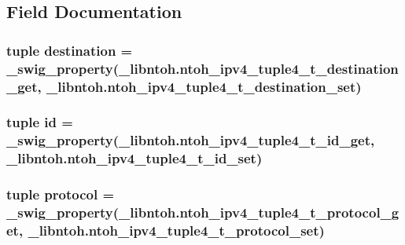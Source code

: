 \subsection{Field Documentation}
\hypertarget{classlibntoh_1_1ntoh__ipv4__tuple4__t_adaac82457baf1096d1c38cadf8123ce7}{
\subsubsection[{destination}]{\setlength{\rightskip}{0pt plus 5cm}tuple destination = {\bf \-\_\-swig\-\_\-property}(\-\_\-libntoh.\-ntoh\-\_\-ipv4\-\_\-tuple4\-\_\-t\-\_\-destination\-\_\-get, \-\_\-libntoh.\-ntoh\-\_\-ipv4\-\_\-tuple4\-\_\-t\-\_\-destination\-\_\-set)\hspace{0.3cm}{\ttfamily [static]}}}\label{classlibntoh_1_1ntoh__ipv4__tuple4__t_adaac82457baf1096d1c38cadf8123ce7}
\hypertarget{classlibntoh_1_1ntoh__ipv4__tuple4__t_a0e43f6071072440917ee2dd8af07d251}{
\subsubsection[{id}]{\setlength{\rightskip}{0pt plus 5cm}tuple id = {\bf \-\_\-swig\-\_\-property}(\-\_\-libntoh.\-ntoh\-\_\-ipv4\-\_\-tuple4\-\_\-t\-\_\-id\-\_\-get, \-\_\-libntoh.\-ntoh\-\_\-ipv4\-\_\-tuple4\-\_\-t\-\_\-id\-\_\-set)\hspace{0.3cm}{\ttfamily [static]}}}\label{classlibntoh_1_1ntoh__ipv4__tuple4__t_a0e43f6071072440917ee2dd8af07d251}
\hypertarget{classlibntoh_1_1ntoh__ipv4__tuple4__t_ae535ff0dd346855882bd298a9e22bbc1}{
\subsubsection[{protocol}]{\setlength{\rightskip}{0pt plus 5cm}tuple protocol = {\bf \-\_\-swig\-\_\-property}(\-\_\-libntoh.\-ntoh\-\_\-ipv4\-\_\-tuple4\-\_\-t\-\_\-protocol\-\_\-get, \-\_\-libntoh.\-ntoh\-\_\-ipv4\-\_\-tuple4\-\_\-t\-\_\-protocol\-\_\-set)\hspace{0.3cm}{\ttfamily [static]}}}\label{classlibntoh_1_1ntoh__ipv4__tuple4__t_ae535ff0dd346855882bd298a9e22bbc1}
